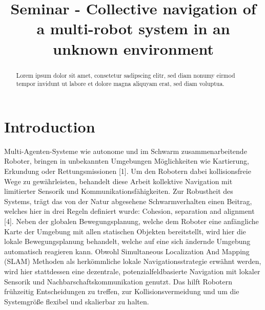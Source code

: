 \documentclass[conference]{IEEEtran}
\begin{document}
\title{Seminar - Collective navigation of a multi-robot system in an unknown environment}
\author{
}

\maketitle


\begin{abstract}
Lorem ipsum dolor sit amet, consetetur sadipscing elitr, sed diam nonumy eirmod tempor invidunt ut labore et dolore magna aliquyam erat, sed diam voluptua.
\end{abstract}


\section{Introduction}
Multi-Agenten-Systeme wie autonome und im Schwarm zusammenarbeitende Roboter, bringen in unbekannten Umgebungen Möglichkeiten wie Kartierung, Erkundung oder Rettungsmissionen [1]. Um den Robotern dabei kollisionsfreie Wege zu gewährleisten, behandelt diese Arbeit kollektive Navigation mit limitierter Sensorik und Kommunikationsfähigkeiten.
Zur Robustheit des Systems, trägt das von der Natur abgesehene Schwarmverhalten einen Beitrag, welches hier in drei Regeln definiert wurde: Cohesion, separation and alignment [4].
Neben der globalen Bewegungsplanung, welche dem Roboter eine anfängliche Karte der Umgebung mit allen statischen Objekten bereitstellt, wird hier die lokale Bewegungsplanung behandelt, welche auf eine sich ändernde Umgebung automatisch reagieren kann.
Obwohl Simultaneous Localization And Mapping (SLAM) Methoden als herkömmliche lokale Navigationsstrategie erwähnt werden, wird hier stattdessen eine dezentrale, potenzialfeldbasierte Navigation mit lokaler Sensorik und Nachbarschaftskommunikation genutzt. Das hilft Robotern frühzeitig Entscheidungen zu treffen, zur Kollisionsvermeidung und um die Systemgröße flexibel und skalierbar zu halten. 
\end{document}
